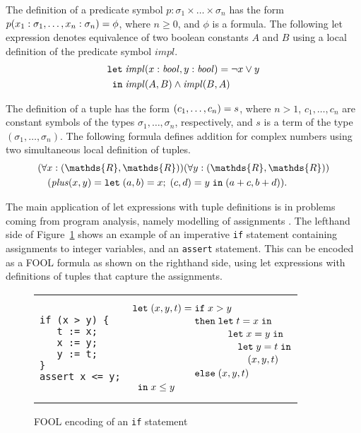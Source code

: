 \documentclass{easychair}
\begin{document}
The definition of a predicate symbol $p:\sigma_1\times\ldots\times\sigma_n$ has 
the form ${p(x_1:\sigma_1,\ldots,x_n:\sigma_n)}={\phi}$, where 
$n \geq 0$, and $\phi$ is a formula.
The following let expression denotes equivalence of two boolean constants 
$A$ and $B$ using a local definition of the predicate symbol $\mathit{impl}$.
\begin{equation}\label{eq:fool-let-impl2}
\begin{aligned}
\mathtt{let}\;&{\mathit{impl}(x:\mathit{bool},y:\mathit{bool})}={\neg x \lor y}\\
 \mathtt{in}\;&\mathit{impl}(A,B)\wedge\mathit{impl}(B,A)
\end{aligned}
\end{equation}

The definition of a tuple has the form ${(c_1,\ldots,c_n)}={s}$, where
$n > 1$, $c_1,\ldots,c_n$ are constant symbols of the types
$\sigma_1,\ldots,\sigma_n$, respectively, and $s$ is a term of the type
$(\sigma_1,\ldots,\sigma_n)$. The following formula defines addition for
complex numbers using two simultaneous local definition of tuples.
\begin{equation}\label{eq:fool-tuple-let}
  \begin{aligned}
  &(\forall x:(\mathds{R},\mathds{R}))(\forall y:(\mathds{R},\mathds{R}))\\
  &\quad(\mathit{plus}(x,y) = \letinpar{(a,b)}{x}{(c,d)}{y}{\tuple{a+c,b+d}).}
  \end{aligned}
\end{equation}

The main application of let expressions with tuple definitions is in 
problems coming from program analysis, namely modelling of assignments
\cite{KKV18}.
The lefthand side of Figure~\ref{fig:simple-if} shows an example of an 
imperative \texttt{if} statement containing assignments to integer variables, 
and an \texttt{assert} statement. 
This can be encoded as a FOOL formula as shown on the righthand side, using 
let expressions with definitions of tuples that capture the assignments.

\begin{figure}[htbp]
\begin{center}
\begin{tabular}[t]{ll}
\begin{minipage}{0.3\textwidth}
\begin{verbatim}
if (x > y) {
   t := x;
   x := y;
   y := t;
}
assert x <= y;
\end{verbatim}
\end{minipage}
&
\begin{minipage}{0.3\textwidth}
\[
  \letnl{(x,y,t)}{\itenll{x > y}
                 {\letinnl{t}{x}
                          {\letinnl{x}{y}
                                   {\letinnl{y}{t}
                                            {(x,y,t)}}}}
                 {(x,y,t)}}
        {x \le y}
\]
\end{minipage}
\\
\end{tabular}
\end{center}
\caption{FOOL encoding of an {\tt if} statement}
\label{fig:simple-if}
\end{figure}
\end{document}
